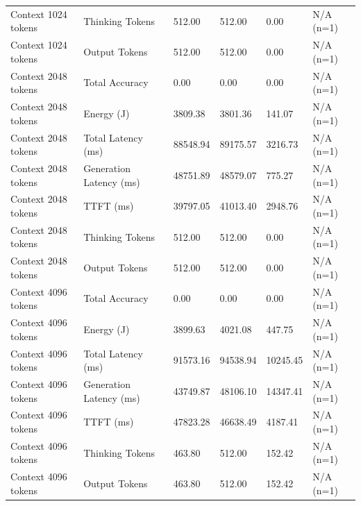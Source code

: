 \begin{table}
\begin{tabular}{llllll}
Context 1024 tokens & Thinking Tokens & 512.00 & 512.00 & 0.00 & N/A (n=1) \\
Context 1024 tokens & Output Tokens & 512.00 & 512.00 & 0.00 & N/A (n=1) \\
Context 2048 tokens & Total Accuracy & 0.00 & 0.00 & 0.00 & N/A (n=1) \\
Context 2048 tokens & Energy (J) & 3809.38 & 3801.36 & 141.07 & N/A (n=1) \\
Context 2048 tokens & Total Latency (ms) & 88548.94 & 89175.57 & 3216.73 & N/A (n=1) \\
Context 2048 tokens & Generation Latency (ms) & 48751.89 & 48579.07 & 775.27 & N/A (n=1) \\
Context 2048 tokens & TTFT (ms) & 39797.05 & 41013.40 & 2948.76 & N/A (n=1) \\
Context 2048 tokens & Thinking Tokens & 512.00 & 512.00 & 0.00 & N/A (n=1) \\
Context 2048 tokens & Output Tokens & 512.00 & 512.00 & 0.00 & N/A (n=1) \\
Context 4096 tokens & Total Accuracy & 0.00 & 0.00 & 0.00 & N/A (n=1) \\
Context 4096 tokens & Energy (J) & 3899.63 & 4021.08 & 447.75 & N/A (n=1) \\
Context 4096 tokens & Total Latency (ms) & 91573.16 & 94538.94 & 10245.45 & N/A (n=1) \\
Context 4096 tokens & Generation Latency (ms) & 43749.87 & 48106.10 & 14347.41 & N/A (n=1) \\
Context 4096 tokens & TTFT (ms) & 47823.28 & 46638.49 & 4187.41 & N/A (n=1) \\
Context 4096 tokens & Thinking Tokens & 463.80 & 512.00 & 152.42 & N/A (n=1) \\
Context 4096 tokens & Output Tokens & 463.80 & 512.00 & 152.42 & N/A (n=1) \\
\bottomrule
\end{tabular}
\end{table}
